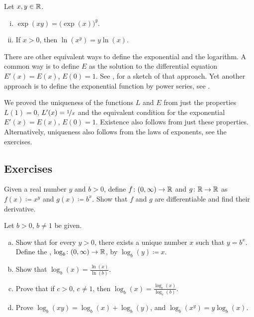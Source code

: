 \begin{prop}
Let $x, y \in {\mathbb{R}}$.
\begin{enumerate}[(i)]
\item
$\exp(xy) = {\bigl(\exp(x)\bigr)}^y$.
\item
If $x > 0$, then $\ln(x^y) = y \ln (x)$.
\end{enumerate}
\end{prop}

\begin{remark}
There are other equivalent ways to define the exponential and the logarithm.
A common way is to define $E$ as the solution to the differential equation
$E'(x) = E(x)$, $E(0) = 1$.  See ,
for a sketch of that approach.  Yet another
approach is to define the exponential function by
power series, see .
\end{remark}

\begin{remark}
We proved the uniqueness of the functions $L$ and $E$ from
just the properties $L(1)=0$, $L'(x) = \nicefrac{1}{x}$
and the equivalent condition for the exponential
$E'(x) = E(x)$, $E(0) = 1$.  Existence also follows
from just these properties.
Alternatively, uniqueness also follows
from the laws of exponents, see the exercises.
\end{remark}

\subsection{Exercises}

\begin{exercise}
Given a real number $y$ and $b > 0$, define $f \colon (0,\infty) \to {\mathbb{R}}$
and $g \colon {\mathbb{R}} \to {\mathbb{R}}$ as $f(x) \coloneqq x^y$ and $g(x) \coloneqq b^x$.  Show that $f$
and $g$ are differentiable and find their derivative.
\end{exercise}

\begin{samepage}
\begin{exercise} \label{exercise:otherlogbases}
Let $b > 0$, $b\neq 1$ be given.
\begin{enumerate}[a)]
\item
Show that for every $y > 0$, there exists a unique number $x$
such that $y = b^x$.  Define
the \emph{},
$\log_b \colon (0,\infty) \to {\mathbb{R}}$, by
$\log_b(y) \coloneqq x$.
\item
Show that $\log_b(x) = \frac{\ln(x)}{\ln(b)}$.
\item
Prove that if $c > 0$, $c \neq 1$, then
$\log_b(x) = \frac{\log_c(x)}{\log_c(b)}$.
\item
Prove $\log_b(xy) =
\log_b(x)+\log_b(y)$, and $\log_b(x^y) = y \log_b(x)$.
\end{enumerate}
\end{exercise}
\end{samepage}


